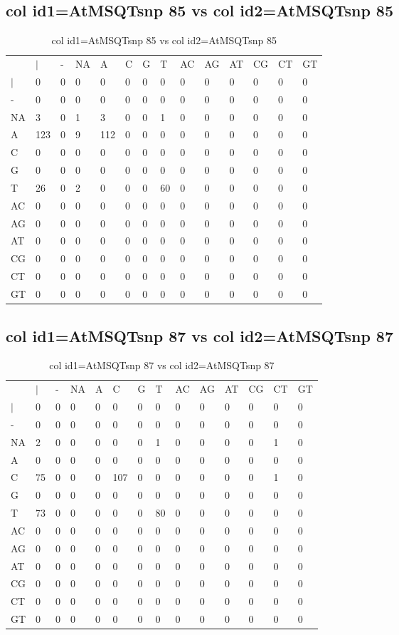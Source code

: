 \subsection{col id1=AtMSQTsnp 85 vs col id2=AtMSQTsnp 85}
\begin{center}
\begin{longtable}{|l|l|l|l|l|l|l|l|l|l|l|l|l|l|}
\caption{col id1=AtMSQTsnp 85 vs col id2=AtMSQTsnp 85} \label{table_dm964}\\
\hline
\\
\hline
&$|$&-&NA&A&C&G&T&AC&AG&AT&CG&CT&GT\\
$|$&0&0&0&0&0&0&0&0&0&0&0&0&0\\
-&0&0&0&0&0&0&0&0&0&0&0&0&0\\
NA&3&0&1&3&0&0&1&0&0&0&0&0&0\\
A&123&0&9&112&0&0&0&0&0&0&0&0&0\\
C&0&0&0&0&0&0&0&0&0&0&0&0&0\\
G&0&0&0&0&0&0&0&0&0&0&0&0&0\\
T&26&0&2&0&0&0&60&0&0&0&0&0&0\\
AC&0&0&0&0&0&0&0&0&0&0&0&0&0\\
AG&0&0&0&0&0&0&0&0&0&0&0&0&0\\
AT&0&0&0&0&0&0&0&0&0&0&0&0&0\\
CG&0&0&0&0&0&0&0&0&0&0&0&0&0\\
CT&0&0&0&0&0&0&0&0&0&0&0&0&0\\
GT&0&0&0&0&0&0&0&0&0&0&0&0&0\\
\hline
\end{longtable}
\end{center}

\subsection{col id1=AtMSQTsnp 87 vs col id2=AtMSQTsnp 87}
\begin{center}
\begin{longtable}{|l|l|l|l|l|l|l|l|l|l|l|l|l|l|}
\caption{col id1=AtMSQTsnp 87 vs col id2=AtMSQTsnp 87} \label{table_dm966}\\
\hline
\\
\hline
&$|$&-&NA&A&C&G&T&AC&AG&AT&CG&CT&GT\\
$|$&0&0&0&0&0&0&0&0&0&0&0&0&0\\
-&0&0&0&0&0&0&0&0&0&0&0&0&0\\
NA&2&0&0&0&0&0&1&0&0&0&0&1&0\\
A&0&0&0&0&0&0&0&0&0&0&0&0&0\\
C&75&0&0&0&107&0&0&0&0&0&0&1&0\\
G&0&0&0&0&0&0&0&0&0&0&0&0&0\\
T&73&0&0&0&0&0&80&0&0&0&0&0&0\\
AC&0&0&0&0&0&0&0&0&0&0&0&0&0\\
AG&0&0&0&0&0&0&0&0&0&0&0&0&0\\
AT&0&0&0&0&0&0&0&0&0&0&0&0&0\\
CG&0&0&0&0&0&0&0&0&0&0&0&0&0\\
CT&0&0&0&0&0&0&0&0&0&0&0&0&0\\
GT&0&0&0&0&0&0&0&0&0&0&0&0&0\\
\hline
\end{longtable}
\end{center}

